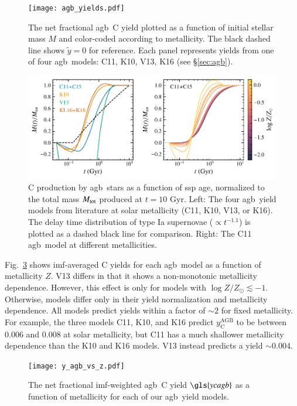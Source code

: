 \documentclass[12pt,oneside,letterpaper]{report}
\newcommand{\agb}{\gls{agb}}
\newcommand{\ssp}{\gls{ssp}}
\newcommand{\imf}{\gls{imf}}
\newcommand{\Ycagb}{\gls{ycagb}}
\newcommand{\about}[1]{${\sim} #1$}
\begin{document}
\begin{figure}
    \centering
 	    \texttt{[image: agb\_yields.pdf]}
        \caption[Low mass C yields]{The net fractional \agb\ C yield  plotted as a function of initial stellar mass $M$ and color-coded according to metallicity. The black dashed line shows $\tilde{y}=0$ for reference. Each panel represents yields from one of four \agb\ models: C11, K10, V13, K16 (see \S \ref{sec:agb}). }
        \label{fig:y_agb}
\end{figure}
\begin{figure}
    \includegraphics[scale=1]{y_agb_t2.pdf}

    \caption[C yields delay time distribution]{
    C production by \agb\ stars as a function of \ssp{} age, normalized to the total mass $M_{\rm tot}$ produced at $t=10$ Gyr. Left: The four \agb\ yield models from literature at solar metallicity (C11, K10, V13, or K16). The delay time distribution of type Ia supernovae ($\propto t^{-1.1}$) is plotted as a dashed black line for comparison. Right: The C11 \agb\ model at different metallicities. }
    \label{fig:agb-ssp}
\end{figure}


Fig.~\ref{fig:yagb-z} shows \imf-averaged C yields for each \agb\ model as a function of metallicity $Z$.
V13 differs in that it shows a non-monotonic metallicity dependence. However, this effect is only for models with $\log Z/Z_\odot \lesssim -1$.
Otherwise, models differ only in their yield normalization and metallicity dependence. All models predict yields within a factor of \about{2} for fixed metallicity.
For example, the three models C11, K10, and K16 predict $y_\text{C}^\text{AGB}$ to be between 0.006 and 0.008 at solar metallicity, but C11 has a much shallower metallicity dependence than the K10 and K16 models. V13 instead predicts a yield \about{0.004}.

\begin{figure}
    \centering
    \texttt{[image: y\_agb\_vs\_z.pdf]}

    \caption[Low mass yield metallicity dependence]{The net fractional \imf-weighted \agb\ C yield $\Ycagb$ as a function of metallicity for each of our \agb\ yield models.
    }
    \label{fig:yagb-z}
\end{figure}
\end{document}
